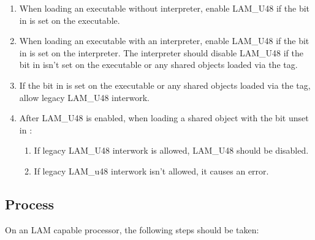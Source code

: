 \begin{enumerate}
  \item
    \begin{sloppypar}
      When loading an executable without interpreter, enable LAM_U48
      if the  bit in
       is set on the executable.
    \end{sloppypar}
  \item
    \begin{sloppypar}
      When loading an executable with an interpreter, enable LAM_U48
      if the  bit in
       is set on the
      interpreter.  The interpreter should disable LAM_U48 if the
       bit in
        isn't set on the
      executable or any shared objects loaded via the 
      tag.
    \end{sloppypar}
   \item If the  bit in
      is set on the
     executable or any shared objects loaded via the
      tag, allow legacy LAM_U48 interwork.
  \item
    \begin{sloppypar}
      After LAM_U48 is enabled, when loading a shared object with the
       bit unset in
      :
      \begin{enumerate}
	\item If legacy LAM_U48 interwork is allowed, LAM_U48 should be
	  disabled.
	\item If legacy LAM_u48 interwork isn't allowed, it causes an
	  error.
      \end{enumerate}
    \end{sloppypar}
\end{enumerate}

\subsection{Process }
\label{lam_u57}

On an LAM capable processor, the following steps should be taken:

